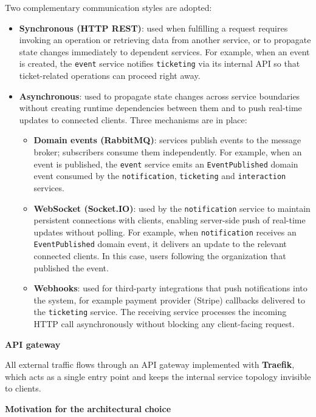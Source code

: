 Two complementary communication styles are adopted:

\begin{itemize}
  \item \textbf{Synchronous (HTTP REST)}: used when fulfilling a request requires invoking an operation or retrieving data from another service, or to propagate state changes immediately to dependent services. For example, when an event is created, the \texttt{event} service notifies \texttt{ticketing} via its internal API so that ticket-related operations can proceed right away.

  \item \textbf{Asynchronous}: used to propagate state changes across service boundaries without creating runtime dependencies between them and to push real-time updates to connected clients. Three mechanisms are in place:
    \begin{itemize}
      \item \textbf{Domain events (RabbitMQ)}: services publish events to the message broker; subscribers consume them independently. For example, when an event is published, the \texttt{event} service emits an \texttt{EventPublished} domain event consumed by the \texttt{notification}, \texttt{ticketing} and \texttt{interaction} services.
      \item \textbf{WebSocket (Socket.IO)}: used by the \texttt{notification} service to maintain persistent connections with clients, enabling server-side push of real-time updates without polling. For example, when \texttt{notification} receives an \texttt{EventPublished} domain event, it delivers an update to the relevant connected clients. In this case, users following the organization that published the event.
      \item \textbf{Webhooks}: used for third-party integrations that push notifications into the system, for example payment provider (Stripe) callbacks delivered to the \texttt{ticketing} service. The receiving service processes the incoming HTTP call asynchronously without blocking any client-facing request.
    \end{itemize}
\end{itemize}

\noindent\textbf{API gateway}

All external traffic flows through an API gateway implemented with \textbf{Traefik}, which acts as a single entry point and keeps the internal service topology invisible to clients.

\medskip
\noindent\textbf{Motivation for the architectural choice}

